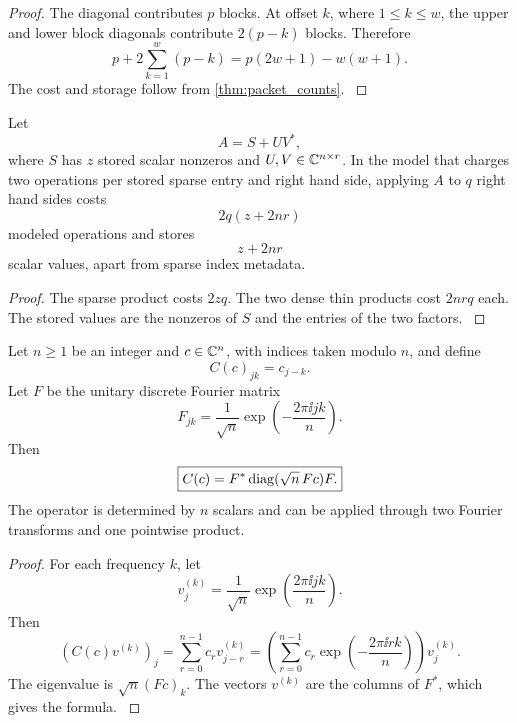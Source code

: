 \begin{proof}\label{main:proof:012}
The diagonal contributes \(p\) blocks. At offset \(k\), where \(1\leq k\leq w\), the upper and lower block diagonals contribute \(2(p-k)\) blocks. Therefore
\[
p+2\sum_{k=1}^{w}(p-k)
=
p(2w+1)-w(w+1).
\]
The cost and storage follow from \cref{thm:packet_counts}.
\label{main:proof:012:end}\end{proof}

\begin{proposition}\label{main:proposition:005}\label{prop:sparse_low_rank}
Let
\[
A=S+UV^*,
\]
where \(S\) has \(z\) stored scalar nonzeros and \(U,V\in\CC^{n\times r}\). In the model that charges two operations per stored sparse entry and right hand side, applying \(A\) to \(q\) right hand sides costs
\[
\boxed{
2q(z+2nr)
}
\]
modeled operations and stores
\[
\boxed{
z+2nr
}
\]
scalar values, apart from sparse index metadata.
\end{proposition}

\begin{proof}\label{main:proof:013}
The sparse product costs \(2zq\). The two dense thin products cost \(2nrq\) each. The stored values are the nonzeros of \(S\) and the entries of the two factors.
\label{main:proof:013:end}\end{proof}

\begin{theorem}\label{main:theorem:006}\label{thm:circulant}
Let $n\ge1$ be an integer and $c\in\CC^n$, with indices taken modulo $n$, and define
\[
C(c)_{jk}=c_{j-k}.
\]
Let \(F\) be the unitary discrete Fourier matrix
\[
F_{jk}
=
\frac{1}{\sqrt n}
\exp\left(-\frac{2\pi\ii jk}{n}\right).
\]
Then
\[
\boxed{
C(c)
=
F^*\operatorname{diag}(\sqrt n\,Fc)F.
}
\]
The operator is determined by \(n\) scalars and can be applied through two Fourier transforms and one pointwise product.
\end{theorem}

\begin{proof}\label{main:proof:014}
For each frequency \(k\), let
\[
v^{(k)}_j
=
\frac{1}{\sqrt n}
\exp\left(\frac{2\pi\ii jk}{n}\right).
\]
Then
\[
(C(c)v^{(k)})_j
=
\sum_{r=0}^{n-1}c_rv^{(k)}_{j-r}
=
\left(
\sum_{r=0}^{n-1}
c_r\exp\left(-\frac{2\pi\ii rk}{n}\right)
\right)v^{(k)}_j.
\]
The eigenvalue is \(\sqrt n(Fc)_k\). The vectors \(v^{(k)}\) are the columns of \(F^*\), which gives the formula.
\label{main:proof:014:end}\end{proof}

